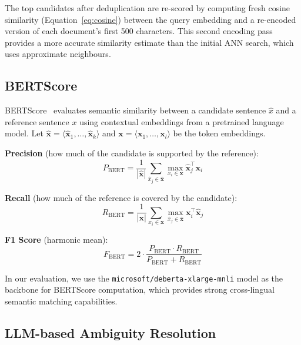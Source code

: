 \documentclass[12pt, a4paper]{article}
\begin{document}
The top candidates after deduplication are re-scored by computing fresh
cosine similarity (Equation~\ref{eq:cosine}) between the query embedding
and a re-encoded version of each document's first 500 characters. This
second encoding pass provides a more accurate similarity estimate than
the initial ANN search, which uses approximate neighbours.

\subsection{BERTScore}
\label{sec:bertscore_theory}

BERTScore~\cite{zhang2020bertscore} evaluates semantic similarity between
a candidate sentence $\hat{x}$ and a reference sentence $x$ using
contextual embeddings from a pretrained language model. Let
$\hat{\mathbf{x}} = \langle \hat{\mathbf{x}}_1, \ldots, \hat{\mathbf{x}}_k \rangle$
and $\mathbf{x} = \langle \mathbf{x}_1, \ldots, \mathbf{x}_l \rangle$ be the
token embeddings.

\textbf{Precision} (how much of the candidate is supported by the reference):
\begin{equation}
  P_{\text{BERT}} = \frac{1}{|\hat{\mathbf{x}}|} \sum_{\hat{x}_j \in \hat{\mathbf{x}}}
  \max_{x_i \in \mathbf{x}} \hat{\mathbf{x}}_j^\top \mathbf{x}_i
  \label{eq:bertscore_p}
\end{equation}

\textbf{Recall} (how much of the reference is covered by the candidate):
\begin{equation}
  R_{\text{BERT}} = \frac{1}{|\mathbf{x}|} \sum_{x_i \in \mathbf{x}}
  \max_{\hat{x}_j \in \hat{\mathbf{x}}} \mathbf{x}_i^\top \hat{\mathbf{x}}_j
  \label{eq:bertscore_r}
\end{equation}

\textbf{F1 Score} (harmonic mean):
\begin{equation}
  F_{\text{BERT}} = 2 \cdot \frac{P_{\text{BERT}} \cdot R_{\text{BERT}}}{P_{\text{BERT}} + R_{\text{BERT}}}
  \label{eq:bertscore_f1}
\end{equation}

In our evaluation, we use the \texttt{microsoft/deberta-xlarge-mnli} model
as the backbone for BERTScore computation, which provides strong cross-lingual
semantic matching capabilities.

\subsection{LLM-based Ambiguity Resolution}
\label{sec:ambiguity_theory}
\end{document}
